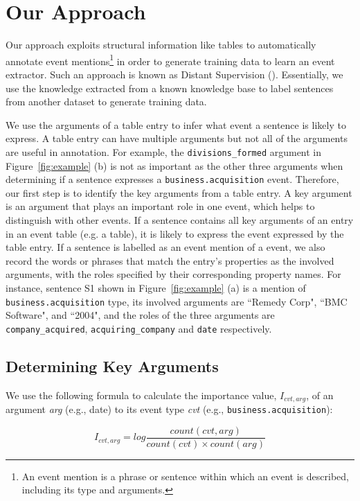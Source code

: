 \section{Our Approach}
Our approach exploits structural information like \FB \CVT tables to  automatically annotate event mentions\footnote{An event mention is a
phrase or sentence within which an event is described, including its type and arguments.} in order to generate training data to learn an
event extractor. Such an approach is known as Distant Supervision (\DS)\FIXME{~\cite{}}. Essentially, we use the knowledge extracted from a
known knowledge base to label sentences from another dataset to generate training data.


We use the arguments of a \CVT table entry to infer what event a sentence is likely to express. A \CVT table entry can have multiple
arguments but not all of the arguments are useful in annotation. For example, the \texttt{divisions\_formed} argument in
Figure~\ref{fig:example} (b) is not as important as the other three arguments when determining if a sentence expresses a
\texttt{business.acquisition} event. Therefore, our first step is to identify the key arguments from a \CVT table entry. A key argument is
an argument that plays an important role in one event, which helps to distinguish with other events. If a sentence contains all key
arguments of an entry in an event table (e.g. a \CVT table), it is likely to express the event expressed by the table entry. If a sentence
is labelled as an event mention of a \CVT event, we also record the words or phrases that match the entry’s properties as the involved
arguments, with the roles specified by their corresponding property names. For instance, sentence S1 shown in Figure~\ref{fig:example} (a)
is a mention of \texttt{business.acquisition} type, its involved arguments are ``Remedy Corp", ``BMC Software", and ``2004", and the roles
of the three arguments are \texttt{company\_acquired}, \texttt{acquiring\_company} and \texttt{date} respectively.

\subsection{Determining Key Arguments}
We use the following formula to calculate the importance value, $I_{cvt, arg}$, of an argument \emph{arg} (e.g., date) to its event type
\emph{cvt} (e.g., \texttt{business.acquisition}):

\begin{equation}
	I_{cvt, arg} = log \frac{count(cvt, arg)}{count(cvt) \times count(arg)}
\end{equation}


